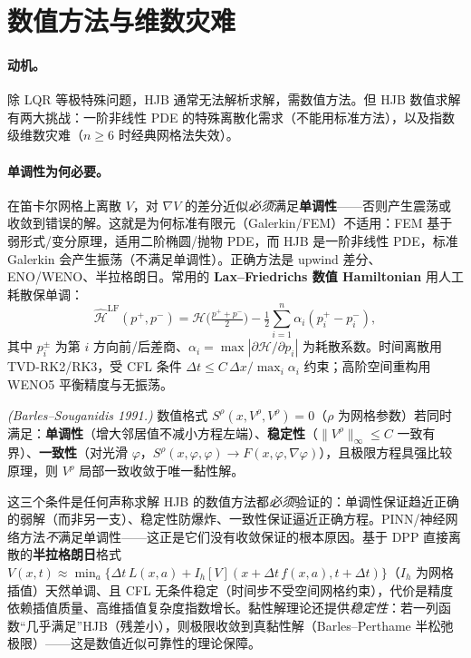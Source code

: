 \section{数值方法与维数灾难}
\label{sec:dp-numerics}

\paragraph{动机。}
除 LQR 等极特殊问题，HJB 通常无法解析求解，需数值方法。但 HJB 数值求解有两大挑战：一阶非线性 PDE 的特殊离散化需求（不能用标准方法），以及指数级维数灾难（$n\ge6$ 时经典网格法失效）。

\paragraph{单调性为何必要。}在笛卡尔网格上离散 $V$，对 $\nabla V$ 的差分近似\emph{必须}满足\textbf{单调性}——否则产生震荡或收敛到错误的解。这就是为何标准有限元（Galerkin/FEM）不适用：FEM 基于弱形式/变分原理，适用二阶椭圆/抛物 PDE，而 HJB 是一阶非线性 PDE，标准 Galerkin 会产生振荡（不满足单调性）。正确方法是 upwind 差分、ENO/WENO、半拉格朗日。常用的 \textbf{Lax--Friedrichs 数值 Hamiltonian} 用人工耗散保单调：
\begin{equation}
  \hat{\mathcal H}^{\mathrm{LF}}(p^+,p^-)=\mathcal H\Big(\tfrac{p^++p^-}2\Big)-\tfrac12\sum_{i=1}^n\alpha_i(p_i^+-p_i^-),
  \label{eq:dp-LF}
\end{equation}
其中 $p_i^\pm$ 为第 $i$ 方向前/后差商、$\alpha_i=\max|\partial\mathcal H/\partial p_i|$ 为耗散系数。时间离散用 TVD-RK2/RK3，受 CFL 条件 $\Delta t\le C\,\Delta x/\max_i\alpha_i$ 约束；高阶空间重构用 WENO5 平衡精度与无振荡。

\begin{theorem}\label{thm:dp-barles}
\emph{(Barles--Souganidis 1991\cite{barles1991convergence}.)} 数值格式 $S^\rho(x,V^\rho,V^\rho)=0$（$\rho$ 为网格参数）若同时满足：\textbf{单调性}（增大邻居值不减小方程左端）、\textbf{稳定性}（$\|V^\rho\|_\infty\le C$ 一致有界）、\textbf{一致性}（对光滑 $\varphi$，$S^\rho(x,\varphi,\varphi)\to F(x,\varphi,\nabla\varphi)$），且极限方程具强比较原理，则 $V^\rho$ 局部一致收敛于唯一黏性解。
\end{theorem}

\begin{remark}[“金科玉律”]
这三个条件是任何声称求解 HJB 的数值方法都\emph{必须}验证的：单调性保证趋近正确的弱解（而非另一支）、稳定性防爆炸、一致性保证逼近正确方程。PINN/神经网络方法\emph{不}满足单调性——这正是它们没有收敛保证的根本原因。基于 DPP 直接离散的\textbf{半拉格朗日}格式 $V(x,t)\approx\min_a\{\Delta t\,L(x,a)+I_h[V](x+\Delta t\,f(x,a),t+\Delta t)\}$（$I_h$ 为网格插值）天然单调、且 CFL 无条件稳定（时间步不受空间网格约束），代价是精度依赖插值质量、高维插值复杂度指数增长。黏性解理论还提供\emph{稳定性}：若一列函数“几乎满足”HJB（残差小），则极限收敛到真黏性解（Barles--Perthame 半松弛极限）——这是数值近似可靠性的理论保障。
\end{remark}

